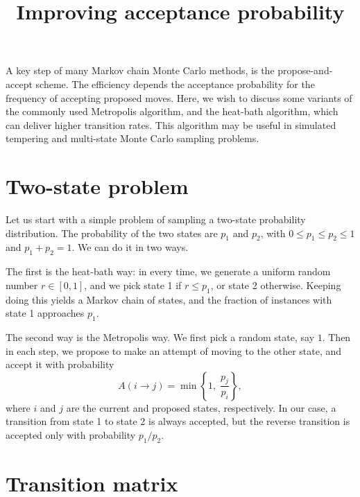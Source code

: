 \documentclass[12pt]{article}
\begin{document}
\title{Improving acceptance probability}
\author{ \vspace{-10ex} }
\date{ \vspace{-10ex} }
\maketitle


A key step of many Markov chain Monte Carlo methods,
is the propose-and-accept scheme.
%
The efficiency depends the acceptance probability
for the frequency of accepting proposed moves.
%
Here, we wish to discuss some variants of
the commonly used Metropolis algorithm,
and the heat-bath algorithm,
which can deliver higher transition rates.
%
This algorithm may be useful in simulated tempering
and multi-state Monte Carlo sampling problems.


\section{Two-state problem}

Let us start with a simple problem of
sampling a two-state probability distribution.
%
The probability of the two states are $p_1$ and $p_2$,
with $0 \le p_1 \le p_2 \le 1$ and $p_1 + p_2 = 1$.
%
We can do it in two ways.


The first is the heat-bath way:
in every time, we generate a uniform random number $r \in [0, 1]$,
and we pick state 1 if $r \le p_1$, or state 2 otherwise.
%
Keeping doing this yields a Markov chain of states,
and the fraction of instances with state 1 approaches $p_1$.

The second way is the Metropolis way.
We first pick a random state, say $1$.
Then in each step,
we propose to make an attempt of moving to the other state,
and accept it with probability
\begin{equation}
  A(i \rightarrow j) = \min\left\{1, \; \frac{ p_j } { p_i } \right\},
  \label{eq:AMetropolis}
\end{equation}
where $i$ and $j$ are the current and proposed states, respectively.
In our case, a transition from state 1 to state 2 is always accepted,
but the reverse transition is accepted
only with probability $p_1/p_2$.

\section{Transition matrix}
\end{document}
